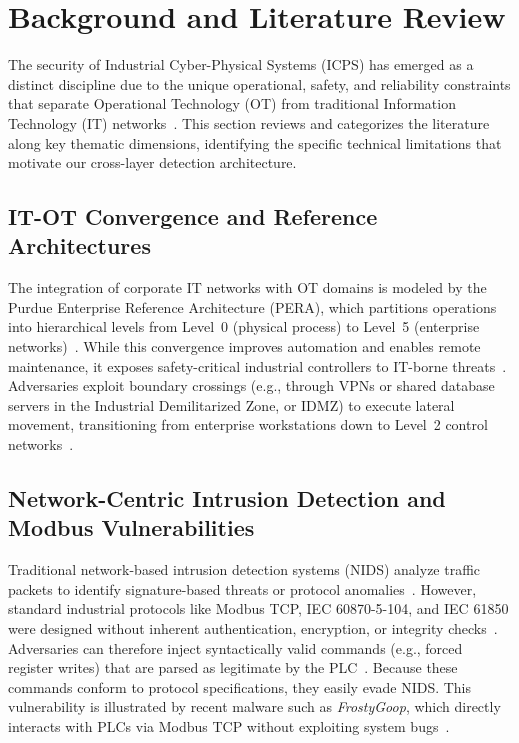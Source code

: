 \documentclass[journal,twoside,web]{ieeecolor}
\begin{document}
\section{Background and Literature Review} \label{sec:background}

The security of Industrial Cyber-Physical Systems (ICPS) has emerged as a distinct discipline due to the unique operational, safety, and reliability constraints that separate Operational Technology (OT) from traditional Information Technology (IT) networks~\cite{stouffer2023guide}. This section reviews and categorizes the literature along key thematic dimensions, identifying the specific technical limitations that motivate our cross-layer detection architecture.

\subsection{IT-OT Convergence and Reference Architectures}
The integration of corporate IT networks with OT domains is modeled by the Purdue Enterprise Reference Architecture (PERA), which partitions operations into hierarchical levels from Level~0 (physical process) to Level~5 (enterprise networks)~\cite{fortinet_purdue, sbc2023purdue}. While this convergence improves automation and enables remote maintenance, it exposes safety-critical industrial controllers to IT-borne threats~\cite{murray2017convergence}. Adversaries exploit boundary crossings (e.g., through VPNs or shared database servers in the Industrial Demilitarized Zone, or IDMZ) to execute lateral movement, transitioning from enterprise workstations down to Level~2 control networks~\cite{paloalto_lateral, forescout2023deep}.

\subsection{Network-Centric Intrusion Detection and Modbus Vulnerabilities}
Traditional network-based intrusion detection systems (NIDS) analyze traffic packets to identify signature-based threats or protocol anomalies~\cite{aslam2024scrutinizing}. However, standard industrial protocols like Modbus TCP, IEC 60870-5-104, and IEC 61850 were designed without inherent authentication, encryption, or integrity checks~\cite{iec104sec2023, iec61850sec2022}. Adversaries can therefore inject syntactically valid commands (e.g., forced register writes) that are parsed as legitimate by the PLC~\cite{bitmotec_modbus, modbus2023penetration}. Because these commands conform to protocol specifications, they easily evade NIDS. This vulnerability is illustrated by recent malware such as \textit{FrostyGoop}, which directly interacts with PLCs via Modbus TCP without exploiting system bugs~\cite{dragos2024frostygoop}.
\end{document}

